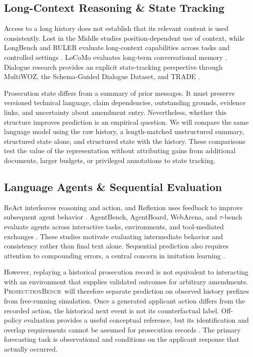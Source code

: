 \documentclass[11pt]{article}
\newcommand{\bench}{\textsc{ProsecutionBench}}
\begin{document}
\subsection{Long-Context Reasoning \& State Tracking}
\label{sec:rw-state-tracking}

Access to a long history does not establish that its relevant content is used consistently. Lost in the Middle studies position-dependent use of context, while LongBench and RULER evaluate long-context capabilities across tasks and controlled settings \citep{liu2024lost,bai2024longbench,hsieh2024ruler}. LoCoMo evaluates long-term conversational memory \citep{maharana2024locomo}. Dialogue research provides an explicit state-tracking perspective through MultiWOZ, the Schema-Guided Dialogue Dataset, and TRADE \citep{budzianowski2018multiwoz,rastogi2019sgd,wu2019trade}.

Prosecution state differs from a summary of prior messages. It must preserve versioned technical language, claim dependencies, outstanding grounds, evidence links, and uncertainty about amendment entry. Nevertheless, whether this structure improves prediction is an empirical question. We will compare the same language model using the raw history, a length-matched unstructured summary, structured state alone, and structured state with the history. These comparisons test the value of the representation without attributing gains from additional documents, larger budgets, or privileged annotations to state tracking.

\subsection{Language Agents \& Sequential Evaluation}
\label{sec:rw-agents}

ReAct interleaves reasoning and action, and Reflexion uses feedback to improve subsequent agent behavior \citep{yao2022react,shinn2023reflexion}. AgentBench, AgentBoard, WebArena, and $\tau$-bench evaluate agents across interactive tasks, environments, and tool-mediated exchanges \citep{liu2023agentbench,ma2024agentboard,zhou2023webarena,yao2024taubench}. These studies motivate evaluating intermediate behavior and consistency rather than final text alone. Sequential prediction also requires attention to compounding errors, a central concern in imitation learning \citep{ross2011dagger}.

However, replaying a historical prosecution record is not equivalent to interacting with an environment that supplies validated outcomes for arbitrary amendments. \bench\ will therefore separate prediction on observed history prefixes from free-running simulation. Once a generated applicant action differs from the recorded action, the historical next event is not its counterfactual label. Off-policy evaluation provides a useful conceptual reference, but its identification and overlap requirements cannot be assumed for prosecution records \citep{dudik2011doubly}. The primary forecasting task is observational and conditions on the applicant response that actually occurred.
\end{document}
